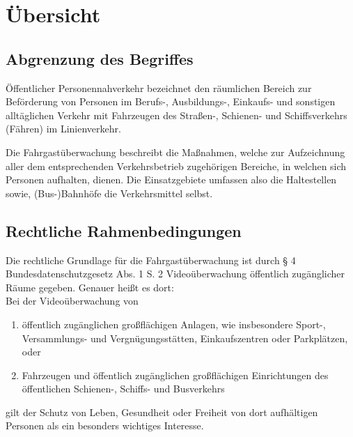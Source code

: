 \section{Übersicht}
\subsection{Abgrenzung des Begriffes} %
Öffentlicher Personennahverkehr bezeichnet den \glqq{}räumlichen Bereich zur Beförderung von Personen im Berufs-,
Ausbildungs-, Einkaufs- und sonstigen alltäglichen Verkehr mit Fahrzeugen des Straßen-, Schienen- und Schiffsverkehrs (Fähren) im Linienverkehr.
\grqq{} \cite{Dr.FriedrichvonStackelbergDr.RobertMalina.2018}

Die Fahrgastüberwachung beschreibt die Maßnahmen, welche zur Aufzeichnung aller dem entsprechenden Verkehrsbetrieb zugehörigen Bereiche, in welchen sich Personen aufhalten, dienen.
Die Einsatzgebiete umfassen also die Haltestellen sowie, (Bus-)Bahnhöfe die Verkehrsmittel selbst.


\subsection{Rechtliche Rahmenbedingungen}
\label{abschnitt:rechtlich}
Die rechtliche Grundlage für die Fahrgastüberwachung ist durch § 4 Bundesdatenschutzgesetz Abs. 1 S. 2 \glqq{} Videoüberwachung öffentlich zugänglicher Räume\grqq{}
gegeben. Genauer heißt es dort:\\
\glqq{}Bei der Videoüberwachung von
\begin{enumerate}
    \item öffentlich zugänglichen großflächigen Anlagen, wie insbesondere Sport-,\\ Versammlungs- und Vergnügungsstätten, Einkaufszentren oder Parkplätzen, oder
    \item Fahrzeugen und öffentlich zugänglichen großflächigen Einrichtungen des öffentlichen Schienen-, Schiffs- und Busverkehrs
\end{enumerate}
gilt der Schutz von Leben, Gesundheit oder Freiheit von dort aufhältigen Personen als ein besonders wichtiges Interesse.\grqq{} \cite{Bundestag.2018}


